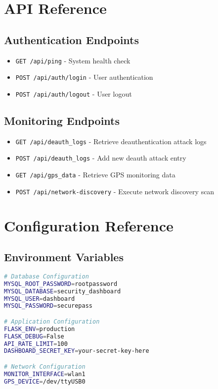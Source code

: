 \documentclass[12pt,a4paper]{report}
\begin{document}
\chapter{API Reference}

\section{Authentication Endpoints}

\begin{itemize}
    \item \texttt{GET /api/ping} - System health check
    \item \texttt{POST /api/auth/login} - User authentication
    \item \texttt{POST /api/auth/logout} - User logout
\end{itemize}

\section{Monitoring Endpoints}

\begin{itemize}
    \item \texttt{GET /api/deauth\_logs} - Retrieve deauthentication attack logs
    \item \texttt{POST /api/deauth\_logs} - Add new deauth attack entry
    \item \texttt{GET /api/gps\_data} - Retrieve GPS monitoring data
    \item \texttt{POST /api/network-discovery} - Execute network discovery scan
\end{itemize}

\chapter{Configuration Reference}

\section{Environment Variables}

\begin{lstlisting}[language=bash,caption={Docker Environment Configuration}]
# Database Configuration
MYSQL_ROOT_PASSWORD=rootpassword
MYSQL_DATABASE=security_dashboard
MYSQL_USER=dashboard
MYSQL_PASSWORD=securepass

# Application Configuration
FLASK_ENV=production
FLASK_DEBUG=False
API_RATE_LIMIT=100
DASHBOARD_SECRET_KEY=your-secret-key-here

# Network Configuration
MONITOR_INTERFACE=wlan1
GPS_DEVICE=/dev/ttyUSB0
\end{lstlisting}
\end{document}
